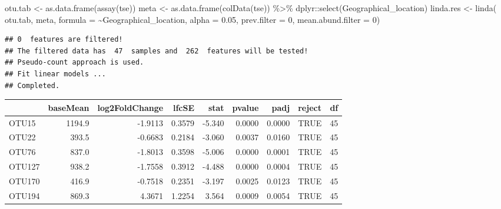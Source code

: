 \documentclass[
]{book}
\newenvironment{Shaded}{\begin{snugshade}}{\end{snugshade}}
\newcommand{\AttributeTok}[1]{\textcolor[rgb]{0.77,0.63,0.00}{#1}}
\newcommand{\CommentTok}[1]{\textcolor[rgb]{0.56,0.35,0.01}{\textit{#1}}}
\newcommand{\DecValTok}[1]{\textcolor[rgb]{0.00,0.00,0.81}{#1}}
\newcommand{\FloatTok}[1]{\textcolor[rgb]{0.00,0.00,0.81}{#1}}
\newcommand{\FunctionTok}[1]{\textcolor[rgb]{0.00,0.00,0.00}{#1}}
\newcommand{\NormalTok}[1]{#1}
\newcommand{\OtherTok}[1]{\textcolor[rgb]{0.56,0.35,0.01}{#1}}
\newcommand{\SpecialCharTok}[1]{\textcolor[rgb]{0.00,0.00,0.00}{#1}}
\newcommand{\StringTok}[1]{\textcolor[rgb]{0.31,0.60,0.02}{#1}}
\begin{document}
\begin{Shaded}
\begin{Highlighting}[]
\NormalTok{otu.tab }\OtherTok{\textless{}{-}} \FunctionTok{as.data.frame}\NormalTok{(}\FunctionTok{assay}\NormalTok{(tse))}
\NormalTok{meta }\OtherTok{\textless{}{-}} \FunctionTok{as.data.frame}\NormalTok{(}\FunctionTok{colData}\NormalTok{(tse)) }\SpecialCharTok{\%\textgreater{}\%}\NormalTok{ dplyr}\SpecialCharTok{::}\FunctionTok{select}\NormalTok{(Geographical\_location)}
\NormalTok{linda.res }\OtherTok{\textless{}{-}} \FunctionTok{linda}\NormalTok{(}
\NormalTok{  otu.tab, }
\NormalTok{  meta, }
  \AttributeTok{formula =} \StringTok{\textquotesingle{}\textasciitilde{}Geographical\_location\textquotesingle{}}\NormalTok{, }
  \AttributeTok{alpha =} \FloatTok{0.05}\NormalTok{, }
  \AttributeTok{prev.filter =} \DecValTok{0}\NormalTok{, }
  \AttributeTok{mean.abund.filter =} \DecValTok{0}\NormalTok{)}
\end{Highlighting}
\end{Shaded}

\begin{verbatim}
## 0  features are filtered!
## The filtered data has  47  samples and  262  features will be tested!
## Pseudo-count approach is used.
## Fit linear models ...
## Completed.
\end{verbatim}

\begin{Shaded}
\end{Shaded}

\begin{tabular}{l|r|r|r|r|r|r|l|r}
\hline
  & baseMean & log2FoldChange & lfcSE & stat & pvalue & padj & reject & df\\
\hline
OTU15 & 1194.9 & -1.9113 & 0.3579 & -5.340 & 0.0000 & 0.0000 & TRUE & 45\\
\hline
OTU22 & 393.5 & -0.6683 & 0.2184 & -3.060 & 0.0037 & 0.0160 & TRUE & 45\\
\hline
OTU76 & 837.0 & -1.8013 & 0.3598 & -5.006 & 0.0000 & 0.0001 & TRUE & 45\\
\hline
OTU127 & 938.2 & -1.7558 & 0.3912 & -4.488 & 0.0000 & 0.0004 & TRUE & 45\\
\hline
OTU170 & 416.9 & -0.7518 & 0.2351 & -3.197 & 0.0025 & 0.0123 & TRUE & 45\\
\hline
OTU194 & 869.3 & 4.3671 & 1.2254 & 3.564 & 0.0009 & 0.0054 & TRUE & 45\\
\hline
\end{tabular}
\end{document}
